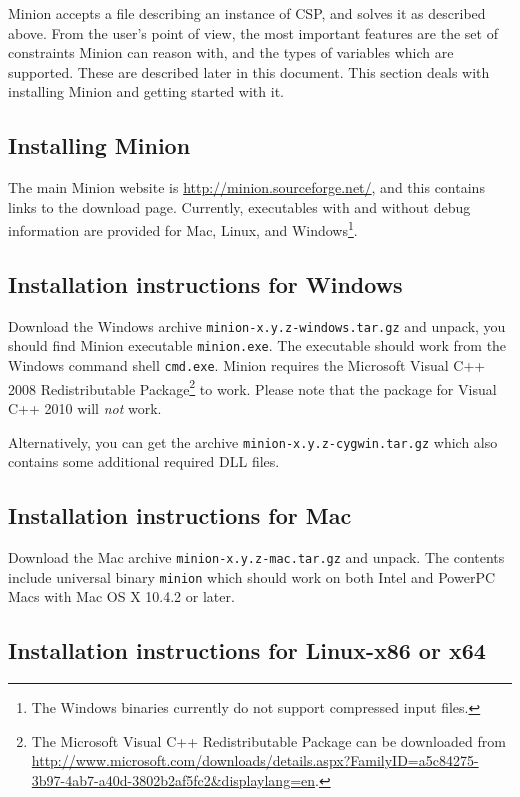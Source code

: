 \documentclass[oneside]{book}
\begin{document}
Minion accepts a file describing an instance of CSP, and solves it
as described above. From the user's point of view, the most important
features are the set of constraints Minion can reason with, and the
types of variables which are supported. These are described later
in this document. This section deals with installing Minion and getting
started with it.


\subsection{Installing Minion}

The main Minion website is \url{http://minion.sourceforge.net/},
and this contains links to the download page. Currently, executables with and
without debug information are provided for Mac, Linux, and
Windows\footnote{The Windows binaries currently do not support compressed input
files.}.


\subsection{Installation instructions for Windows}

Download the Windows archive \texttt{minion-x.y.z-windows.tar.gz} and unpack,
you should find Minion executable \texttt{minion.exe}. The executable should
work from the Windows command shell \texttt{cmd.exe}. Minion requires the
Microsoft Visual C++ 2008 Redistributable Package\footnote{The Microsoft Visual C++
Redistributable Package can be downloaded from
\url{http://www.microsoft.com/downloads/details.aspx?FamilyID=a5c84275-3b97-4ab7-a40d-3802b2af5fc2&displaylang=en}.}
to work. Please note that the package for Visual C++ 2010 will \emph{not} work.

Alternatively, you can get the archive \texttt{minion-x.y.z-cygwin.tar.gz} which
also contains some additional required DLL files.


\subsection{Installation instructions for Mac}

Download the Mac archive \texttt{minion-x.y.z-mac.tar.gz} and unpack. The contents
include universal binary \texttt{minion} which should work on both Intel and PowerPC
Macs with Mac OS X 10.4.2 or later.


\subsection{Installation instructions for Linux-x86 or x64}
\end{document}
